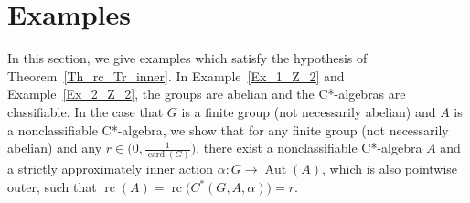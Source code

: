 \documentclass[10pt]{amsart}
\numberwithin{equation}{section}
\theoremstyle{definition}
\newcommand{\card}{{\operatorname{card}}}
\newcommand{\Aut}{{\operatorname{Aut}}}
\newcommand{\rc}{{\operatorname{rc}}}
\begin{document}
\section{Examples}
\label{Sec_Example}
In this section, we give examples which satisfy the hypothesis of Theorem~\ref{Th_rc_Tr_inner}.
In Example~\ref{Ex_1_Z_2} and Example~\ref{Ex_2_Z_2}, the  groups are abelian and the C*-algebras are classifiable.
In the case that $G$ is a finite group (not necessarily abelian)
 and $A$ is a nonclassifiable C*-algebra, we show that
  for any finite group (not necessarily abelian) and any $r \in \big(0, \frac{1}{\card (G)}\big)$,
there exist a nonclassifiable C*-algebra $A$ and a
strictly approximately inner action $\alpha \colon G \to \Aut (A)$, which is also pointwise outer, such that 
$\rc (A)= \rc \big( C^*(G, A, \alpha)\big)=r$.
%
\end{document}
